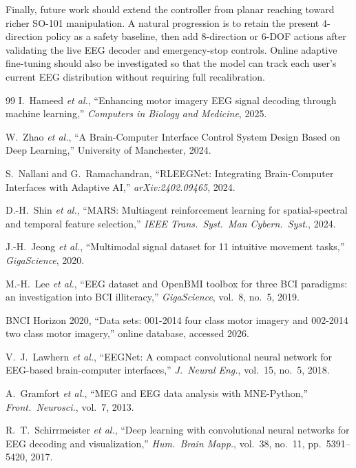 \documentclass[12pt, a4paper]{article}
\begin{document}
Finally, future work should extend the controller from planar reaching toward richer SO-101 manipulation. A natural progression is to retain the present 4-direction policy as a safety baseline, then add 8-direction or 6-DOF actions after validating the live EEG decoder and emergency-stop controls. Online adaptive fine-tuning should also be investigated so that the model can track each user's current EEG distribution without requiring full recalibration.

\begin{thebibliography}{99}
I.~Hameed \emph{et al.}, ``Enhancing motor imagery EEG signal decoding through machine learning,'' \textit{Computers in Biology and Medicine}, 2025.

W.~Zhao \emph{et al.}, ``A Brain-Computer Interface Control System Design Based on Deep Learning,'' University of Manchester, 2024.

S.~Nallani and G.~Ramachandran, ``RLEEGNet: Integrating Brain-Computer Interfaces with Adaptive AI,'' \textit{arXiv:2402.09465}, 2024.

D.-H.~Shin \emph{et al.}, ``MARS: Multiagent reinforcement learning for spatial-spectral and temporal feature selection,'' \textit{IEEE Trans.\ Syst.\ Man Cybern.\ Syst.}, 2024.

J.-H.~Jeong \emph{et al.}, ``Multimodal signal dataset for 11 intuitive movement tasks,'' \textit{GigaScience}, 2020.

M.-H.~Lee \emph{et al.}, ``EEG dataset and OpenBMI toolbox for three BCI paradigms: an investigation into BCI illiteracy,'' \textit{GigaScience}, vol.~8, no.~5, 2019.

BNCI Horizon 2020, ``Data sets: 001-2014 four class motor imagery and 002-2014 two class motor imagery,'' online database, accessed 2026.

V.~J.~Lawhern \emph{et al.}, ``EEGNet: A compact convolutional neural network for EEG-based brain-computer interfaces,'' \textit{J.\ Neural Eng.}, vol.~15, no.~5, 2018.

A.~Gramfort \emph{et al.}, ``MEG and EEG data analysis with MNE-Python,'' \textit{Front.\ Neurosci.}, vol.~7, 2013.

R.~T.~Schirrmeister \emph{et al.}, ``Deep learning with convolutional neural networks for EEG decoding and visualization,'' \textit{Hum.\ Brain Mapp.}, vol.~38, no.~11, pp.~5391--5420, 2017.


\end{thebibliography}
\end{document}
